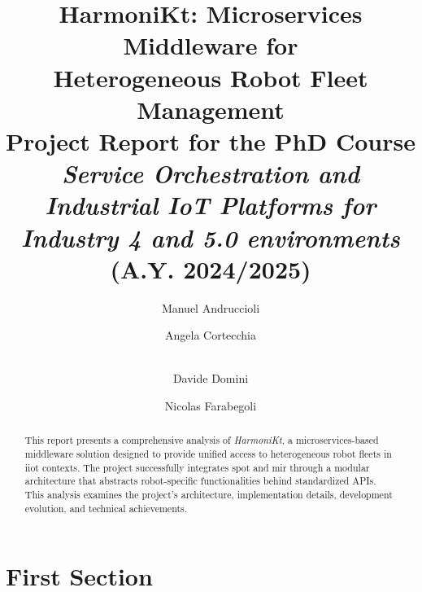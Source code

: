 \documentclass[runningheads]{llncs}
\newcommand{\thesystem}{\textit{HarmoniKt}\xspace}
\begin{document}
%
\title{HarmoniKt: Microservices Middleware for\\Heterogeneous Robot Fleet Management\\
\small\textnormal{
    Project Report for the PhD Course \emph{Service Orchestration and Industrial IoT Platforms for Industry 4 and 5.0 environments} (A.Y. 2024/2025)
}
}
%
%
\author{
Manuel Andruccioli \and
Angela Cortecchia \and
\\
Davide Domini \and
Nicolas Farabegoli
}
%
%
%
\maketitle              %
%
\begin{abstract}
This report presents a comprehensive analysis of \thesystem, a microservices-based middleware solution designed to provide unified access to heterogeneous robot fleets in \ac{iiot} contexts. The project successfully integrates \ac{spot} and \ac{mir} through a modular architecture that abstracts robot-specific functionalities behind standardized APIs. This analysis examines the project's architecture, implementation details, development evolution, and technical achievements.

\end{abstract}
%
%
%
\section{First Section}
\end{document}
